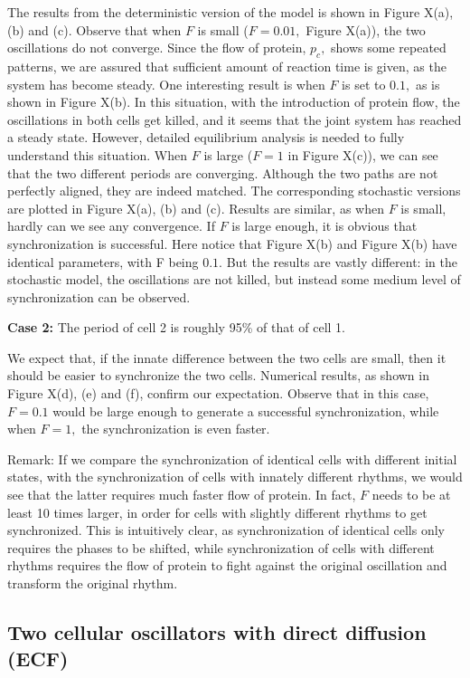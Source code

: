 \documentclass[12pt]{article}
\renewcommand{\(}{\left (}
\renewcommand{\)}{\right )}
\begin{document}
The results from the deterministic version of the model is shown in Figure X(a), (b) and (c). Observe that when $F$ is small ($F=0.01,$ Figure X(a)), the two oscillations do not converge. Since the flow of protein, $p_c,$ shows some repeated patterns, we are assured that sufficient amount of reaction time is given, as the system has become steady. One interesting result is when $F$ is set to $0.1,$ as is shown in Figure X(b). In this situation, with the introduction of protein flow, the oscillations in both cells get killed, and it seems that the joint system has reached a steady state. However, detailed equilibrium analysis is needed to fully understand this situation. When $F$ is large ($F = 1$ in Figure X(c)), we can see that the two different periods are converging. Although the two paths are not perfectly aligned, they are indeed matched. The corresponding stochastic versions are plotted in Figure X(a), (b) and (c). Results are similar, as when $F$ is small, hardly can we see any convergence. If $F$ is large enough, it is obvious that synchronization is successful. Here notice that Figure X(b) and Figure X(b) have identical parameters, with F being $0.1.$ But the results are vastly different: in the stochastic model, the oscillations are not killed, but instead some medium level of synchronization can be observed.



\textbf{Case 2:} The period of cell 2 is roughly 95\% of that of cell 1.

We expect that, if the innate difference between the two cells are small, then it should be easier to synchronize the two cells. Numerical results, as shown in Figure X(d), (e) and (f), confirm our expectation. Observe that in this case, $F=0.1$ would be large enough to generate a successful synchronization, while when $F=1,$ the synchronization is even faster.

Remark: If we compare the synchronization of identical cells with different initial states, with the synchronization of cells with innately different rhythms, we would see that the latter requires much faster flow of protein. In fact, $F$ needs to be at least 10 times larger, in order for cells with slightly different rhythms to get synchronized. This is intuitively clear, as synchronization of identical cells only requires the phases to be shifted, while synchronization of cells with different rhythms requires the flow of protein to fight against the original oscillation and transform the original rhythm.


\subsection{Two cellular oscillators with direct diffusion (ECF)}
\end{document}
